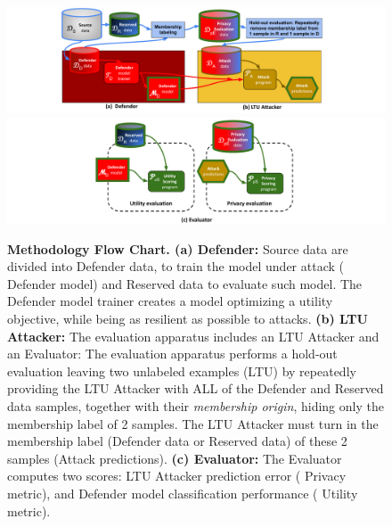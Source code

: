 \documentclass[letterpaper]{article}
\begin{document}
\begin{figure}[!h]
\begin{centering}
  \includegraphics[width=\textwidth]{Figures/flowchart_part1.pdf} \\
  \includegraphics[width=\textwidth]{Figures/flowchart_part2.pdf}
  \caption{{\bf Methodology Flow Chart. (a) Defender:} Source data are divided into {\color{red} Defender data}, to train the model under attack ({\color{red} Defender model}) and {\color{blue} Reserved data} to evaluate such model. The {\color{red} Defender model trainer} creates a model optimizing a utility objective, while being as resilient as possible to attacks. {\bf (b) LTU Attacker:} The evaluation apparatus includes an {\color{orange} LTU Attacker} and an {\color{teal} Evaluator}: The evaluation apparatus performs a hold-out evaluation leaving two unlabeled examples (LTU) by repeatedly providing the {\color{orange} LTU Attacker} with ALL of the {\color{red} Defender} and {\color{blue} Reserved} data samples, together with their {\em membership origin}, hiding only the membership label of 2 samples. The {\color{orange} LTU Attacker} must turn in the membership label (Defender data or Reserved data) of these 2 samples (Attack predictions). {\bf (c) Evaluator:} The {\color{teal} Evaluator} computes two scores: {\color{orange} LTU Attacker} prediction error ({\color{teal} Privacy metric}), and {\color{red} Defender model} classification performance ({\color{teal} Utility metric}).}
  \label{fig:teaser}
  \end{centering}
\end{figure}
\end{document}
